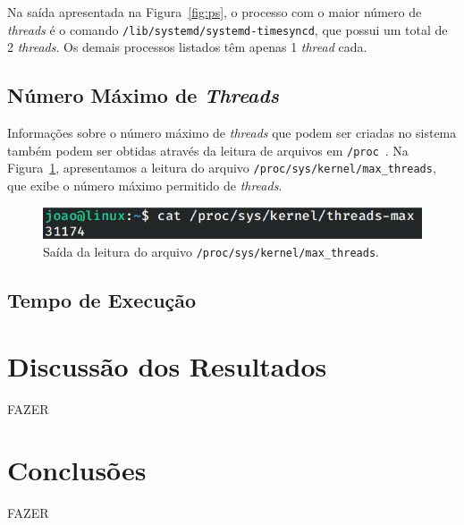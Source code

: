 \documentclass[
	12pt,				%
	oneside,   	        %
	a4paper,			%
	english,			%
	french,				%
	spanish,			%
	brazil,				%
	]{pacotes/abntex2}
\begin{document}
Na saída apresentada na Figura~\ref{fig:ps}, o processo com o maior número de \textit{threads} é o comando \texttt{/lib/systemd/systemd-timesyncd}, que possui um total de 2 \textit{threads}. Os demais processos listados têm apenas 1 \textit{thread} cada.

\subsection{Número Máximo de \textit{Threads}}
\label{subsec:max_threads}

Informações sobre o número máximo de \textit{threads} que podem ser criadas no sistema também podem ser obtidas através da leitura de arquivos em \texttt{/proc}~\cite{negus2012}. Na Figura~\ref{fig:max_threads}, apresentamos a leitura do arquivo \texttt{/proc/sys/kernel/max\_threads}, que exibe o número máximo permitido de \textit{threads}.

\begin{figure}[H]
  \centering
  \includegraphics[scale=0.45]{figuras/max_threads.png}
  \caption{Saída da leitura do arquivo \texttt{/proc/sys/kernel/max\_threads}.}
  \label{fig:max_threads}
\end{figure}

\subsection{Tempo de Execução}
\label{subsec:time}

\section{Discussão dos Resultados}
\label{sec:discussao}
FAZER

\section{Conclusões}
\label{sec:conclusoes}
FAZER

\postextual
\renewcommand{\bibsection}{%
\section{\bibname}
\bibmark
\prebibhook}


\end{document}
